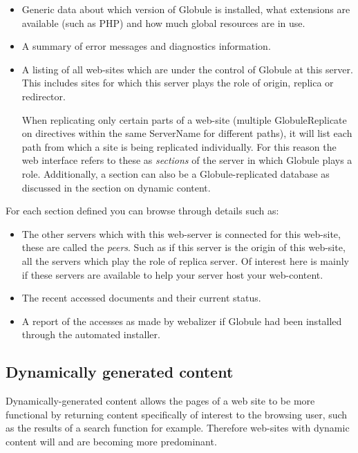 \documentclass[10pt,a4paper]{article}
\makeatletter
\newenvironment{p}{\@open{P}{}}{\@close{P}}
\newenvironment{p}{}{\par}
\newcommand\subsectionbr{}
\makeatother
\begin{document}
\begin{p}
\begin{itemize}
\item Generic data about which version of Globule is installed, what
extensions are available (such as PHP) and how much global resources are in
use.
\item A summary of error messages and diagnostics information.
\item A listing of all web-sites which are under the control of Globule at
this server.  This includes sites for which this server plays the role of
origin, replica or redirector.

When replicating only certain parts of a web-site (multiple GlobuleReplicate
on directives within the same ServerName for different paths), it will list
each path from which a site is being replicated individually.
For this reason the web interface refers to these as \emph{sections} of the
server in which Globule plays a role.  Additionally, a section can also be a
Globule-replicated database as discussed in the section on dynamic content.
\end{itemize}
\end{p}

\begin{p}
For each section defined you can browse through details such as:
\begin{itemize}
\item The other servers which with this web-server is connected for this
web-site, these are called the \emph{peers}.  Such as if this server is the
origin of this web-site, all the servers which play the role of replica
server.  Of interest here is mainly if these servers are available to help
your server host your web-content.
\item The recent accessed documents and their current status.
\item A report of the accesses as made by webalizer if Globule had been
installed through the automated installer.
\end{itemize}
\end{p}


\newpage
\subsection{\label{sec:dyncontent}
  Dynamically generated content\subsectionbr}

\begin{p}
Dynamically-generated content allows the pages of a web site to be more
functional by returning content specifically of interest to the browsing user,
such as the results of a search function for example.  Therefore web-sites
with dynamic content will and are becoming more predominant.
\end{p}
\end{document}
